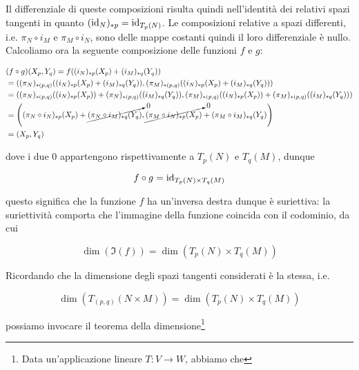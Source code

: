 {Il differenziale di queste composizioni risulta quindi nell'identità dei relativi spazi tangenti in quanto $ (\operatorname{id}_{N})_{*p} = \operatorname{id}_{T_{p}(N)} $. Le composizioni relative a spazi differenti, i.e. $ \pi_{N} \circ i_{M} $ e $ \pi_{M} \circ i_{N} $, sono delle mappe costanti quindi il loro differenziale è nullo. \\
Calcoliamo ora la seguente composizione delle funzioni $ f $ e $ g $:

\begin{align}
	\begin{split}
		&(f \circ g) (X_{p}, Y_{q}) = f ( (i_{N})_{*p} (X_{p}) + (i_{M})_{*q} (Y_{q}) ) \\
		&= ( (\pi_{N})_{*(p,q)} ( (i_{N})_{*p} (X_{p}) + (i_{M})_{*q} (Y_{q}) ), (\pi_{M})_{*(p,q)} ( (i_{N})_{*p} (X_{p}) + (i_{M})_{*q} (Y_{q}) ) ) \\
		&= ( (\pi_{N})_{*(p,q)} ( (i_{N})_{*p} (X_{p}) ) + (\pi_{N})_{*(p,q)} ( (i_{M})_{*q} (Y_{q}) ), (\pi_{M})_{*(p,q)} ( (i_{N})_{*p} (X_{p})) + (\pi_{M})_{*(p,q)} ( (i_{M})_{*q} (Y_{q}) ) ) \\
		&= \left( (\pi_{N} \circ i_{N})_{*p} (X_{p}) + \cancelto{0}{ (\pi_{N} \circ i_{M})_{*q} (Y_{q}) }, \cancelto{0}{ (\pi_{M} \circ i_{N})_{*p} (X_{p}) } + (\pi_{M} \circ i_{M})_{*q} (Y_{q}) \right) \\
		&=(X_{p}, Y_{q})
	\end{split}
\end{align}

dove i due $ 0 $ appartengono rispettivamente a $ T_{p}(N) $ e $ T_{q}(M) $, dunque

\begin{equation}
	f \circ g = \operatorname{id}_{T_{p}(N) \times T_{q}(M)}
\end{equation}

questo significa che la funzione $ f $ ha un'inversa destra dunque è suriettiva: la suriettività comporta che l'immagine della funzione coincida con il codominio, da cui

\begin{equation}
	\dim(\Im(f)) = \dim(T_{p}(N) \times T_{q}(M))
\end{equation}

Ricordando che la dimensione degli spazi tangenti considerati è la stessa, i.e.

\begin{equation}
	\dim(T_{(p,q)}(N \times M)) = \dim(T_{p}(N) \times T_{q}(M))
\end{equation}

possiamo invocare il teorema della dimensione\footnote{%
	Data un'applicazione lineare $ T : V \to W $, abbiamo che
	
}}
